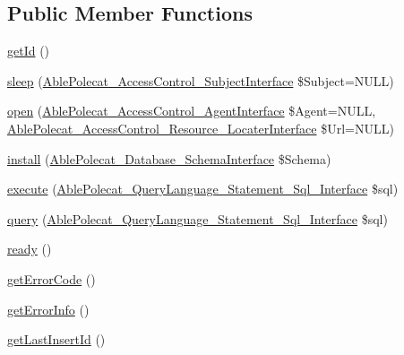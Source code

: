 \subsection*{Public Member Functions}
\begin{DoxyCompactItemize}
\item 
\hyperlink{class_able_polecat___database___pdo_a12251d0c022e9e21c137a105ff683f13}{get\+Id} ()
\item 
\hyperlink{class_able_polecat___database___pdo_a365e24d7b066205cafa2a5cce3a4f224}{sleep} (\hyperlink{interface_able_polecat___access_control___subject_interface}{Able\+Polecat\+\_\+\+Access\+Control\+\_\+\+Subject\+Interface} \$Subject=N\+U\+L\+L)
\item 
\hyperlink{class_able_polecat___database___pdo_a4ce5c2e3d8229d890939c780db9c8ba8}{open} (\hyperlink{interface_able_polecat___access_control___agent_interface}{Able\+Polecat\+\_\+\+Access\+Control\+\_\+\+Agent\+Interface} \$Agent=N\+U\+L\+L, \hyperlink{interface_able_polecat___access_control___resource___locater_interface}{Able\+Polecat\+\_\+\+Access\+Control\+\_\+\+Resource\+\_\+\+Locater\+Interface} \$Url=N\+U\+L\+L)
\item 
\hyperlink{class_able_polecat___database___pdo_aba618d13fc7fc2ddca23db57614cd14d}{install} (\hyperlink{interface_able_polecat___database___schema_interface}{Able\+Polecat\+\_\+\+Database\+\_\+\+Schema\+Interface} \$Schema)
\item 
\hyperlink{class_able_polecat___database___pdo_a2446b764608f23c472255a8e07076aff}{execute} (\hyperlink{interface_able_polecat___query_language___statement___sql___interface}{Able\+Polecat\+\_\+\+Query\+Language\+\_\+\+Statement\+\_\+\+Sql\+\_\+\+Interface} \$sql)
\item 
\hyperlink{class_able_polecat___database___pdo_a036b9fde55003e5c63dd6345b0f2a805}{query} (\hyperlink{interface_able_polecat___query_language___statement___sql___interface}{Able\+Polecat\+\_\+\+Query\+Language\+\_\+\+Statement\+\_\+\+Sql\+\_\+\+Interface} \$sql)
\item 
\hyperlink{class_able_polecat___database___pdo_a4196646b44144f7864b51e915f41fa84}{ready} ()
\item 
\hyperlink{class_able_polecat___database___pdo_a5f04b6f467dace4e4b9a81611e658c4d}{get\+Error\+Code} ()
\item 
\hyperlink{class_able_polecat___database___pdo_aa17a52a88134e9ba51a0731ba3ba4d6f}{get\+Error\+Info} ()
\item 
\hyperlink{class_able_polecat___database___pdo_aaf8e789036f518ea4523e095d1892e34}{get\+Last\+Insert\+Id} ()

\end{DoxyCompactItemize}
